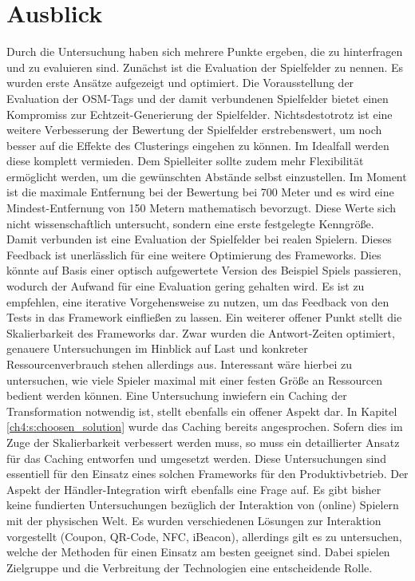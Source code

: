 \section{Ausblick}

Durch die Untersuchung haben sich mehrere Punkte ergeben, die zu hinterfragen und zu evaluieren sind. Zunächst ist die Evaluation der Spielfelder zu nennen. Es wurden erste Ansätze aufgezeigt und optimiert. Die Vorausstellung der Evaluation der OSM-Tags und der damit verbundenen Spielfelder bietet einen Kompromiss zur Echtzeit-Generierung der Spielfelder. Nichtsdestotrotz ist eine weitere Verbesserung der Bewertung der Spielfelder erstrebenswert, um noch besser auf die Effekte des Clusterings eingehen zu können. Im Idealfall werden diese komplett vermieden. Dem Spielleiter sollte zudem mehr Flexibilität ermöglicht werden, um die gewünschten Abstände selbst einzustellen. Im Moment ist die maximale Entfernung bei der Bewertung bei 700 Meter und es wird eine Mindest-Entfernung von 150 Metern  mathematisch bevorzugt. Diese Werte sich nicht wissenschaftlich untersucht, sondern eine erste festgelegte Kenngröße.
Damit verbunden ist eine Evaluation der Spielfelder bei realen Spielern. Dieses Feedback ist unerlässlich für eine weitere Optimierung des Frameworks. Dies könnte auf Basis einer optisch aufgewertete Version des Beispiel Spiels passieren, wodurch der Aufwand für eine Evaluation gering gehalten wird.
Es ist zu empfehlen, eine iterative Vorgehensweise zu nutzen, um das Feedback von den Tests in das Framework einfließen zu lassen.
Ein weiterer offener Punkt stellt die Skalierbarkeit des Frameworks dar. Zwar wurden die Antwort-Zeiten optimiert, genauere Untersuchungen im Hinblick auf Last und konkreter Ressourcenverbrauch stehen allerdings aus. Interessant wäre hierbei zu untersuchen, wie viele Spieler maximal mit einer festen Größe an Ressourcen bedient werden können. Eine Untersuchung inwiefern ein Caching der Transformation notwendig ist, stellt ebenfalls ein offener Aspekt dar. In Kapitel \ref{ch4:s:choosen_solution} wurde das Caching bereits angesprochen. Sofern dies im Zuge der Skalierbarkeit verbessert werden muss, so muss ein detaillierter Ansatz für das Caching entworfen und umgesetzt werden. 
Diese Untersuchungen sind essentiell für den Einsatz eines solchen Frameworks für den Produktivbetrieb.
Der Aspekt der Händler-Integration wirft ebenfalls eine Frage auf. Es gibt bisher keine fundierten Untersuchungen bezüglich der Interaktion von (online) Spielern mit der physischen Welt. Es wurden verschiedenen Lösungen zur Interaktion vorgestellt (Coupon, QR-Code, NFC, iBeacon), allerdings gilt es zu untersuchen, welche der Methoden für einen Einsatz am besten geeignet sind. Dabei spielen Zielgruppe und die Verbreitung der Technologien eine entscheidende Rolle.
